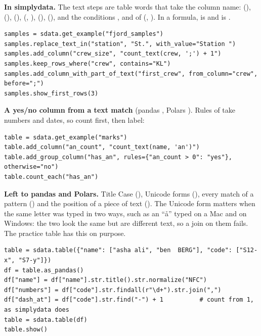 \textbf{In simplydata.} The text steps are table words that take the column name:
 (),  (),
 (), 
(, ),  (),
 (), and the conditions ,
 and  of  (,
). In a formula,  is  and
 is .

\begin{lstlisting}[style=py]
samples = sdata.get_example("fjord_samples")
samples.replace_text_in("station", "St.", with_value="Station ")
samples.add_column("crew_size", "count_text(crew, ';') + 1")
samples.keep_rows_where("crew", contains="KL")
samples.add_column_with_part_of_text("first_crew", from_column="crew", before=";")
samples.show_first_rows(3)
\end{lstlisting}

\textbf{A yes/no column from a text match} (pandas ,
Polars ). Rules of  take
numbers and dates, so count first, then label:

\begin{lstlisting}[style=py]
table = sdata.get_example("marks")
table.add_column("an_count", "count_text(name, 'an')")
table.add_group_column("has_an", rules={"an_count > 0": "yes"}, otherwise="no")
table.count_each("has_an")
\end{lstlisting}

\textbf{Left to pandas and Polars.} Title Case (), Unicode forms (),
every match of a pattern () and the position of a piece of text (). The
Unicode form matters when the same letter was typed in two ways, such as an ``{\aa}'' typed on a Mac and
on Windows: the two look the same but are different text, so a join on them fails. The
 practice table has this on purpose.

\begin{lstlisting}[style=py]
table = sdata.table({"name": ["asha ali", "ben  BERG"], "code": ["S12-x", "S7-y"]})
df = table.as_pandas()
df["name"] = df["name"].str.title().str.normalize("NFC")
df["numbers"] = df["code"].str.findall(r"\d+").str.join(",")
df["dash_at"] = df["code"].str.find("-") + 1          # count from 1, as simplydata does
table = sdata.table(df)
table.show()
\end{lstlisting}

